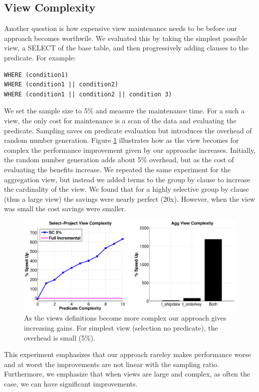 \subsection{View Complexity}
Another question is how expensive view maintenance needs to be before our approach becomes worthwile.
We evaluated this by taking the simplest possible view, a SELECT of the base table, and then progressively adding clauses to the predicate.
For example:
\begin{lstlisting}
WHERE (condition1)
WHERE (condition1 || condition2)
WHERE (condition1 || condition2 || condition 3)
\end{lstlisting}
We set the sample size to 5\% and measure the maintenance time.
For a such a view, the only cost for maintenance is a scan of the data and evaluating the predicate. 
Sampling saves on predicate evaluation but introduces the overhead of random number generation.
Figure \ref{exp11overheads} illustrates how as the view becomes for complex the performance improvement given
by our approache increases.
Initially, the random number generation adds about 5\% overhead, but as the cost of evaluating the benefits increase.
We repeated the same experiment for the aggregation view, but instead we added terms to the group by clause to increase the
cardinality of the view.
We found that for a highly selective group by clause (thus a large view) the savings were nearly perfect (20x).
However, when the view was small the cost savings were smaller.
\begin{figure}[h]
\label{exp11overheads}
\centering
 \includegraphics[width=\columnwidth]{exp/complexity_efficiency_tradeoff.eps}
 \caption{As the views definitions become more complex our approach gives increasing gains. For simplest view (selection no predicate), the overhead is small (5\%). }
\end{figure}
This experiment emphasizes that our approach rareley makes performance worse and at worst the improvements are not linear with the sampling ratio.
Furthermore, we emphasize that when views are large and complex, as often the case, we can have significant improvements.

